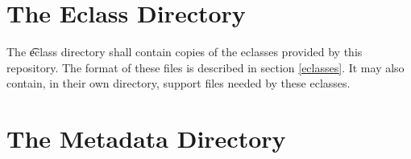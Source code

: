 \section{The Eclass Directory}
\label{eclass_dir}

The \t{eclass} directory shall contain copies of the eclasses provided by this repository. The
format of these files is described in section \ref{eclasses}. It may also contain, in their own
directory, support files needed by these eclasses.

\section{The Metadata Directory}
\label{metadata_dir}

